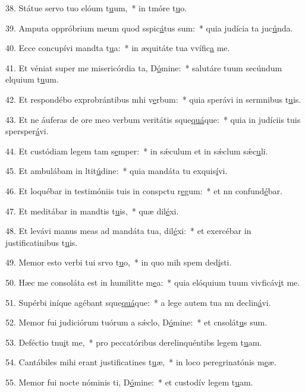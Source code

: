 38. Státue servo tuo elóum t\uline{u}um,~* in tmóre t\uline{u}o.\par 
39. Amputa oppróbrium meum quod sspic\uline{á}tus sum:~* quia judícia ta juc\uline{ú}nda.\par 
40. Ecce concupívi mandta t\uline{u}a:~* in æquitáte tua vvífic\uline{a} me.\par 
41. Et véniat super me misericórdia ta, D\uline{ó}mine:~* salutáre tuum secúndum elquium t\uline{u}um.\par 
42. Et respondébo exprobrántibus mhi v\uline{e}rbum:~* quia sperávi in sermnibus t\uline{u}is.\par 
43. Et ne áuferas de ore meo verbum veritátis sque\uline{quá}que:~* quia in judíciis tuis spersper\uline{á}vi.\par 
44. Et custódiam legem tam s\uline{e}mper:~* in sǽculum et in sǽclum sǽc\uline{u}li.\par 
45. Et ambulábam in ltit\uline{ú}dine:~* quia mandáta tu exquis\uline{í}vi.\par 
46. Et loquébar in testimóniis tuis in conspctu r\uline{e}gum:~* et nn confund\uline{é}bar.\par 
47. Et meditábar in mandtis t\uline{u}is,~* quæ dil\uline{é}xi.\par 
48. Et levávi manus meas ad mandáta tua,  dil\uline{é}xi:~* et exercébar in justificatinibus t\uline{u}is.\par 
49. Memor esto verbi tui srvo t\uline{u}o,~* in quo mih spem ded\uline{í}sti.\par 
50. Hæc me consoláta est in humilitte m\uline{e}a:~* quia elóquium tuum vivficáv\uline{i}t me.\par 
51. Supérbi iníque agébant sque\uline{quá}que:~* a lege autem tua nn declin\uline{á}vi.\par 
52. Memor fui judiciórum tuórum a sǽclo, D\uline{ó}mine:~* et cnsolát\uline{u}s sum.\par 
53. Deféctio tnu\uline{i}t me,~* pro peccatóribus derelinquéntibs legem t\uline{u}am.\par 
54. Cantábiles mihi erant justificatines t\uline{u}æ,~* in loco peregrinatónis m\uline{e}æ.\par 
55. Memor fui nocte nóminis ti, D\uline{ó}mine:~* et custodív legem t\uline{u}am.\par 
